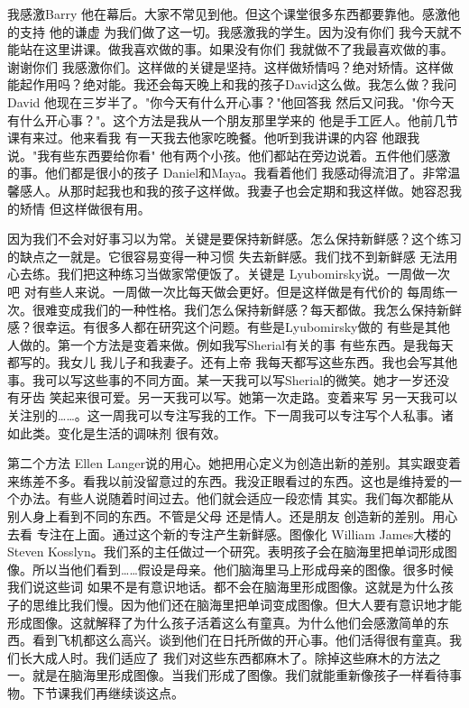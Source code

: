 我感激Barry 他在幕后。大家不常见到他。但这个课堂很多东西都要靠他。感激他的支持 他的谦虚 为我们做了这一切。我感激我的学生。因为没有你们 我今天就不能站在这里讲课。做我喜欢做的事。如果没有你们 我就做不了我最喜欢做的事。谢谢你们 我感激你们。这样做的关键是坚持。这样做矫情吗？绝对矫情。这样做能起作用吗？绝对能。我还会每天晚上和我的孩子David这么做。我怎么做？我问David 他现在三岁半了。"你今天有什么开心事？"他回答我 然后又问我。"你今天有什么开心事？"。这个方法是我从一个朋友那里学来的 他是手工匠人。他前几节课有来过。他来看我 有一天我去他家吃晚餐。他听到我讲课的内容 他跟我说。"我有些东西要给你看" 他有两个小孩。他们都站在旁边说着。五件他们感激的事。他们都是很小的孩子 Daniel和Maya。我看着他们 我感动得流泪了。非常温馨感人。从那时起我也和我的孩子这样做。我妻子也会定期和我这样做。她容忍我的矫情 但这样做很有用。 

因为我们不会对好事习以为常。关键是要保持新鲜感。怎么保持新鲜感？这个练习的缺点之一就是。它很容易变得一种习惯 失去新鲜感。我们找不到新鲜感 无法用心去练。我们把这种练习当做家常便饭了。关键是 Lyubomirsky说。一周做一次吧 对有些人来说。一周做一次比每天做会更好。但是这样做是有代价的 每周练一次。很难变成我们的一种性格。我们怎么保持新鲜感？每天都做。我怎么保持新鲜感？很幸运。有很多人都在研究这个问题。有些是Lyubomirsky做的 有些是其他人做的。第一个方法是变着来做。例如我写Sherial有关的事 有些东西。是我每天都写的。我女儿 我儿子和我妻子。还有上帝 我每天都写这些东西。我也会写其他事。我可以写这些事的不同方面。某一天我可以写Sherial的微笑。她才一岁还没有牙齿 笑起来很可爱。另一天我可以写。她第一次走路。变着来写 另一天我可以关注别的……。这一周我可以专注写我的工作。下一周我可以专注写个人私事。诸如此类。变化是生活的调味剂 很有效。 

第二个方法 Ellen Langer说的用心。她把用心定义为创造出新的差别。其实跟变着来练差不多。看我以前没留意过的东西。我没正眼看过的东西。这也是维持爱的一个办法。有些人说随着时间过去。他们就会适应一段恋情 其实。我们每次都能从别人身上看到不同的东西。不管是父母 还是情人。还是朋友 创造新的差别。用心去看 专注在上面。通过这个新的专注产生新鲜感。图像化 William James大楼的Steven Kosslyn。我们系的主任做过一个研究。表明孩子会在脑海里把单词形成图像。所以当他们看到……假设是母亲。他们脑海里马上形成母亲的图像。很多时候我们说这些词 如果不是有意识地话。都不会在脑海里形成图像。这就是为什么孩子的思维比我们慢。因为他们还在脑海里把单词变成图像。但大人要有意识地才能形成图像。这就解释了为什么孩子活着这么有童真。为什么他们会感激简单的东西。看到飞机都这么高兴。谈到他们在日托所做的开心事。他们活得很有童真。我们长大成人时。我们适应了 我们对这些东西都麻木了。除掉这些麻木的方法之一。就是在脑海里形成图像。当我们形成了图像。我们就能重新像孩子一样看待事物。下节课我们再继续谈这点。 

